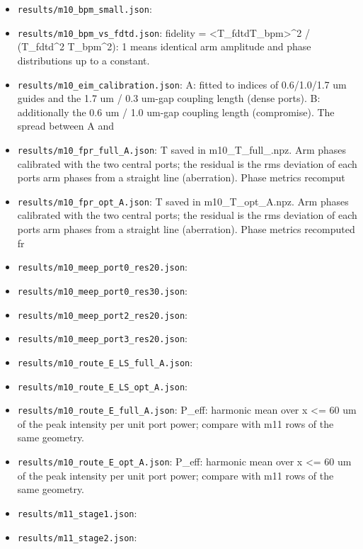 \begin{itemize}
\tightlist
\item
  \texttt{results/m10\_bpm\_small.json}:
\item
  \texttt{results/m10\_bpm\_vs\_fdtd.json}: fidelity =
  \textbar\textless T\_fdtd\textbar T\_bpm\textgreater\textbar\^{}2 /
  (\textbar T\_fdtd\textbar\^{}2 \textbar T\_bpm\textbar\^{}2): 1 means
  identical arm amplitude and phase distributions up to a constant.
\item
  \texttt{results/m10\_eim\_calibration.json}: A: fitted to indices of
  0.6/1.0/1.7 um guides and the 1.7 um / 0.3 um-gap coupling length
  (dense ports). B: additionally the 0.6 um / 1.0 um-gap coupling length
  (compromise). The spread between A and
\item
  \texttt{results/m10\_fpr\_full\_A.json}: T saved in
  m10\_T\_full\_.npz. Arm phases calibrated with the two central ports;
  the residual is the rms deviation of each port\textquotesingle s arm
  phases from a straight line (aberration). Phase metrics recomput
\item
  \texttt{results/m10\_fpr\_opt\_A.json}: T saved in m10\_T\_opt\_A.npz.
  Arm phases calibrated with the two central ports; the residual is the
  rms deviation of each port\textquotesingle s arm phases from a
  straight line (aberration). Phase metrics recomputed fr
\item
  \texttt{results/m10\_meep\_port0\_res20.json}:
\item
  \texttt{results/m10\_meep\_port0\_res30.json}:
\item
  \texttt{results/m10\_meep\_port2\_res20.json}:
\item
  \texttt{results/m10\_meep\_port3\_res20.json}:
\item
  \texttt{results/m10\_route\_E\_LS\_full\_A.json}:
\item
  \texttt{results/m10\_route\_E\_LS\_opt\_A.json}:
\item
  \texttt{results/m10\_route\_E\_full\_A.json}: P\_eff: harmonic mean
  over \textbar x\textbar{} \textless= 60 um of the peak intensity per
  unit port power; compare with m11 rows of the same geometry.
\item
  \texttt{results/m10\_route\_E\_opt\_A.json}: P\_eff: harmonic mean
  over \textbar x\textbar{} \textless= 60 um of the peak intensity per
  unit port power; compare with m11 rows of the same geometry.
\item
  \texttt{results/m11\_stage1.json}:
\item
  \texttt{results/m11\_stage2.json}:

\end{itemize}
